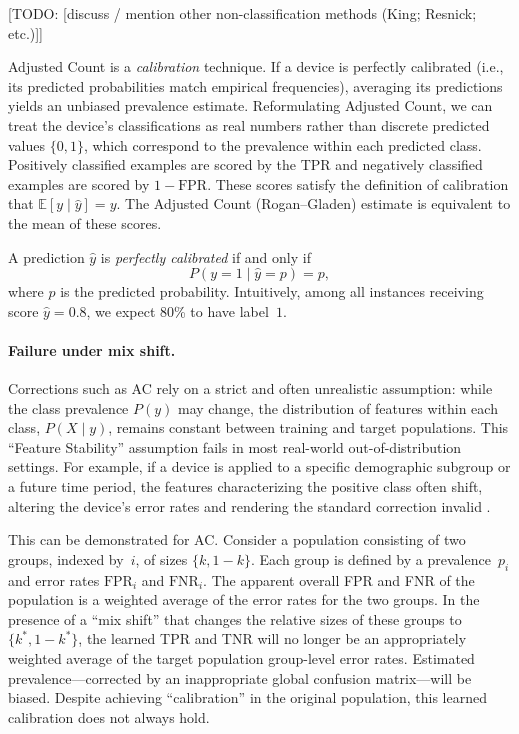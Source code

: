 \documentclass[12pt]{article}
\begin{document}
[TODO: [discuss / mention other non-classification methods (King; Resnick; etc.)]]

Adjusted Count is a \emph{calibration} technique. If a device is perfectly
calibrated (i.e., its predicted probabilities match empirical frequencies),
averaging its predictions yields an unbiased prevalence estimate.
Reformulating Adjusted Count, we can treat the device's classifications as
real numbers rather than discrete predicted values $\{0,1\}$, which
correspond to the prevalence within each predicted class. Positively
classified examples are scored by the TPR and negatively classified
examples are scored by $1 - \text{FPR}$. These scores satisfy the
definition of calibration that $\mathbb{E}[y \mid \hat{y}] = y$. The
Adjusted Count (Rogan--Gladen) estimate is equivalent to the mean of these
scores.

A prediction $\hat{y}$ is \emph{perfectly calibrated} if and only if
\[
  P(y = 1 \mid \hat{y} = p) = p,
\]
where $p$ is the predicted probability. Intuitively, among all instances
receiving score $\hat{y} = 0.8$, we expect 80\% to have label~$1$.


\paragraph{Failure under mix shift.}
Corrections such as AC rely on a strict and often unrealistic assumption:
while the class prevalence $P(y)$ may change, the distribution of features
within each class, $P(X \mid y)$, remains constant between training and
target populations. This ``Feature Stability'' assumption fails in most
real-world out-of-distribution settings. For example, if a device is
applied to a specific demographic subgroup or a future time period, the
features characterizing the positive class often shift, altering the
device's error rates and rendering the standard correction invalid
\citep{wu2024stable}.

This can be demonstrated for AC. Consider a population consisting of two
groups, indexed by~$i$, of sizes $\{k, 1-k\}$. Each group is defined by a
prevalence~$p_i$ and error rates $\text{FPR}_i$ and $\text{FNR}_i$. The
apparent overall FPR and FNR of the population is a weighted average of the
error rates for the two groups. In the presence of a ``mix shift'' that
changes the relative sizes of these groups to $\{k^*, 1-k^*\}$, the
learned TPR and TNR will no longer be an appropriately weighted average of
the target population group-level error rates. Estimated prevalence---corrected
by an inappropriate global confusion matrix---will be biased. Despite
achieving ``calibration'' in the original population, this learned
calibration does not always hold.
\end{document}
